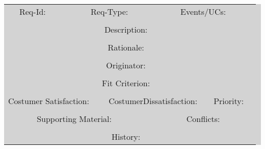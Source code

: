 \documentclass[12pt,a4paper]{article}
\begin{document}
\colorbox{lightgray}{

\begin{tabular}{c|c|c|c|c|c|c|c|c|c|c|c|c|c|c|c|c|c|c|}
 
  \cline{1-4} \cline{6-9} \cline{11-18}
  \multicolumn{4}{|p{3cm}|}{Req-Id: } &  &\multicolumn{4}{|p{3cm}|}{Req-Type:} &  &  \multicolumn{8}{|p{6cm}|}{Events/UCs:} \\
  \cline{1-4} \cline{6-9} \cline{11-18}
  
  \multicolumn{1}{l}{}\\[-2ex]
 
  \hline
  \multicolumn{18}{|p{12cm}|}{Description: } \\
  \hline
 
  \multicolumn{1}{l}{}\\[-2ex]
  
  \hline
  \multicolumn{18}{|p{12cm}|}{Rationale: } \\
  \hline
  
  \multicolumn{1}{l}{}\\[-2ex]
  
  \hline
  \multicolumn{18}{|p{12cm}|}{Originator: } \\
  \hline
  
  \multicolumn{1}{l}{}\\[-2ex]
  
  \hline
  \multicolumn{18}{|p{12cm}|}{Fit Criterion: } \\
  \hline
  
  \multicolumn{1}{l}{}\\[-2ex]
  
  \cline{1-6} \cline{8-13} \cline{15-18}
  \multicolumn{6}{|p{4.5cm}|}{Costumer Satisfaction: } &  &\multicolumn{6}{|p{5cm}|}{CostumerDissatisfaction:} &  &  \multicolumn{4}{|p{2cm}|}{Priority:} \\
  \cline{1-6} \cline{8-13} \cline{15-18}
  
  \multicolumn{1}{l}{}\\[-2ex]
  
  \cline{1-9} \cline{11-18}
  \multicolumn{9}{|p{6.5cm}|}{Supporting Material: } &  &\multicolumn{8}{|p{5cm}|}{Conflicts:} \\
  \cline{1-9} \cline{11-18}
  
  \multicolumn{1}{l}{}\\[-2ex]
  
  
  \hline
  \multicolumn{18}{|p{12cm}|}{History: } \\
  \hline

\end{tabular}
}  %
\end{document}
